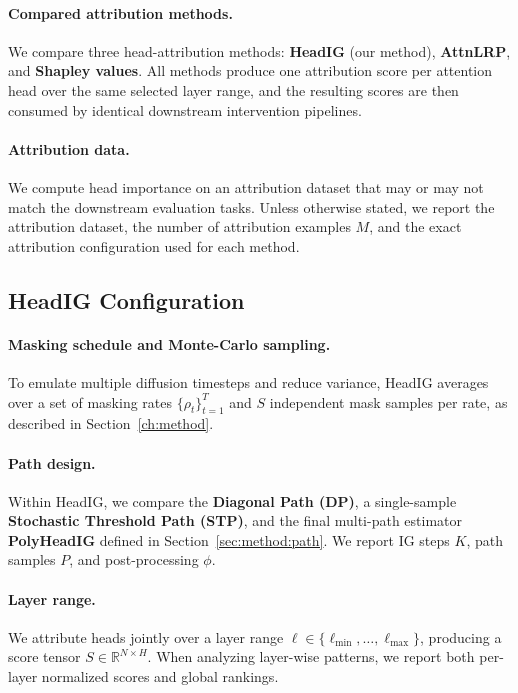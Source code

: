 \paragraph{Compared attribution methods.}
We compare three head-attribution methods: \textbf{HeadIG} (our method), \textbf{AttnLRP}, and \textbf{Shapley values}. All methods produce one attribution score per attention head over the same selected layer range, and the resulting scores are then consumed by identical downstream intervention pipelines.

\paragraph{Attribution data.}
We compute head importance on an attribution dataset that may or may not match the downstream evaluation tasks. Unless otherwise stated, we report the attribution dataset, the number of attribution examples $M$, and the exact attribution configuration used for each method.

\subsection{HeadIG Configuration}
\label{sec:exp:headig_config}

\paragraph{Masking schedule and Monte-Carlo sampling.}
To emulate multiple diffusion timesteps and reduce variance, HeadIG averages over a set of masking rates $\{\rho_t\}_{t=1}^{T}$ and $S$ independent mask samples per rate, as described in Section~\ref{ch:method}.

\paragraph{Path design.}
Within HeadIG, we compare the \textbf{Diagonal Path (DP)}, a single-sample \textbf{Stochastic Threshold Path (STP)}, and the final multi-path estimator \textbf{PolyHeadIG} defined in Section~\ref{sec:method:path}. We report IG steps $K$, path samples $P$, and post-processing $\phi$.

\paragraph{Layer range.}
We attribute heads jointly over a layer range $\ell\in\{\ell_{\min},\ldots,\ell_{\max}\}$, producing a score tensor $S\in\mathbb{R}^{N\times H}$. When analyzing layer-wise patterns, we report both per-layer normalized scores and global rankings.

